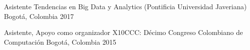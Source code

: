 

\begin{cvhonors}


  \cvhonor
  {Asistente}
  {Tendencias en Big Data y Analytics (Pontificia Universidad Javeriana)}
  {Bogotá, Colombia}
  {2017}

  \cvhonor
  {Asistente, Apoyo como organizador} %
  {X10CCC: Décimo Congreso Colombiano de Computación} %
  {Bogotá, Colombia} %
  {2015} %

\end{cvhonors}
